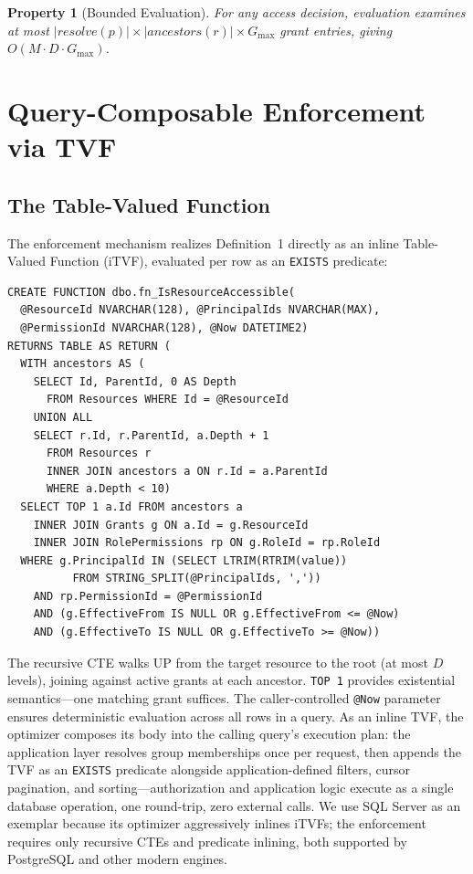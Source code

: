 \documentclass[conference]{IEEEtran}
\newtheorem{property}{Property}
\begin{document}
\begin{property}[Bounded Evaluation]
For any access decision, evaluation examines at most $|\mathit{resolve}(p)| \times |\mathit{ancestors}(r)| \times G_{\max}$ grant entries, giving $O(M \cdot D \cdot G_{\max})$.
\end{property}

\section{Query-Composable Enforcement via TVF}
\label{sec:tvf}

\subsection{The Table-Valued Function}

The enforcement mechanism realizes Definition~1 directly as an inline Table-Valued Function (iTVF), evaluated per row as an \texttt{EXISTS} predicate:

\begin{lstlisting}[style=sql]
CREATE FUNCTION dbo.fn_IsResourceAccessible(
  @ResourceId NVARCHAR(128), @PrincipalIds NVARCHAR(MAX),
  @PermissionId NVARCHAR(128), @Now DATETIME2)
RETURNS TABLE AS RETURN (
  WITH ancestors AS (
    SELECT Id, ParentId, 0 AS Depth
      FROM Resources WHERE Id = @ResourceId
    UNION ALL
    SELECT r.Id, r.ParentId, a.Depth + 1
      FROM Resources r
      INNER JOIN ancestors a ON r.Id = a.ParentId
      WHERE a.Depth < 10)
  SELECT TOP 1 a.Id FROM ancestors a
    INNER JOIN Grants g ON a.Id = g.ResourceId
    INNER JOIN RolePermissions rp ON g.RoleId = rp.RoleId
  WHERE g.PrincipalId IN (SELECT LTRIM(RTRIM(value))
          FROM STRING_SPLIT(@PrincipalIds, ','))
    AND rp.PermissionId = @PermissionId
    AND (g.EffectiveFrom IS NULL OR g.EffectiveFrom <= @Now)
    AND (g.EffectiveTo IS NULL OR g.EffectiveTo >= @Now))
\end{lstlisting}

The recursive CTE walks UP from the target resource to the root (at most $D$ levels), joining against active grants at each ancestor. \texttt{TOP 1} provides existential semantics---one matching grant suffices. The caller-controlled \texttt{@Now} parameter ensures deterministic evaluation across all rows in a query. As an inline TVF, the optimizer composes its body into the calling query's execution plan: the application layer resolves group memberships once per request, then appends the TVF as an \texttt{EXISTS} predicate alongside application-defined filters, cursor pagination, and sorting---authorization and application logic execute as a single database operation, one round-trip, zero external calls. We use SQL Server as an exemplar because its optimizer aggressively inlines iTVFs; the enforcement requires only recursive CTEs and predicate inlining, both supported by PostgreSQL and other modern engines.
\end{document}
